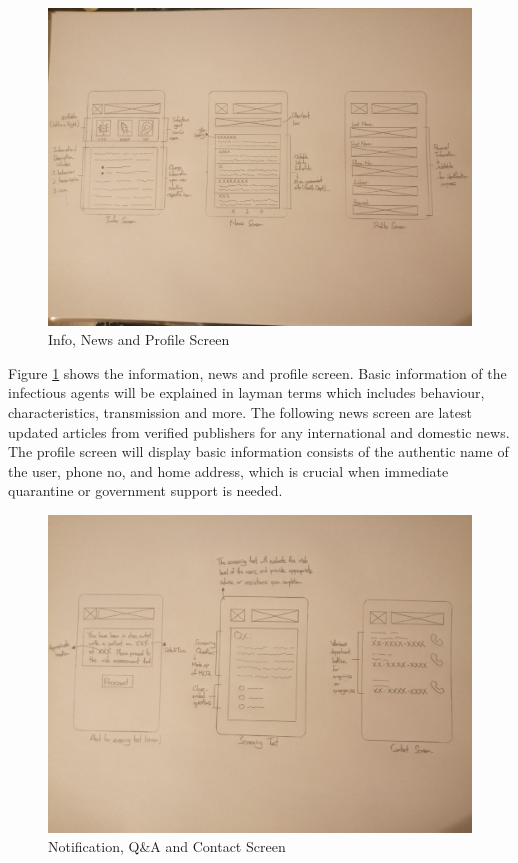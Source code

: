       \begin{figure}[H]
        \centering
        \includegraphics[width=18cm]{img/low-fidelity-prototype/sketch-2.png}
        \caption{Info, News and Profile Screen}
        \label{fig:prototype-02}
      \end{figure}

      \par Figure \ref{fig:prototype-02} shows the information, news and profile screen. Basic information of the infectious agents will be explained in layman terms which includes behaviour, characteristics, transmission and more. The following news screen are latest updated articles from verified publishers for any international and domestic news. The profile screen will display basic information consists of the authentic name of the user, phone no, and home address, which is crucial when immediate quarantine or government support is needed.

      \begin{figure}[H]
        \centering
        \includegraphics[width=18cm]{img/low-fidelity-prototype/sketch-3.png}
        \caption{Notification, Q\&A and Contact Screen}
        \label{fig:prototype-03}
      \end{figure}
      
